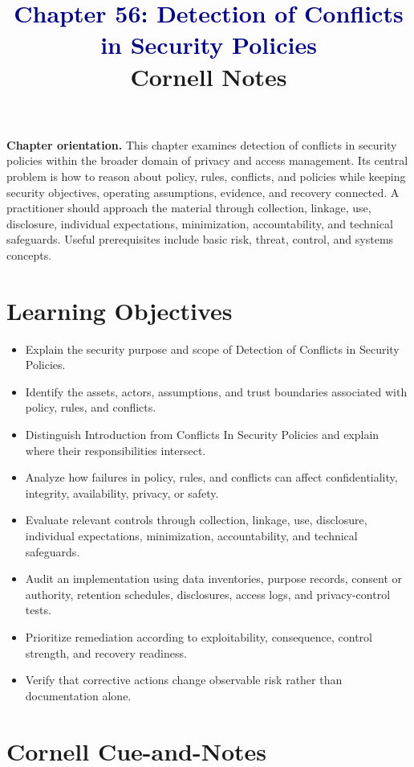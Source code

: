 \documentclass[11pt]{article}
\title{\textcolor{Navy}{Chapter 56: Detection of Conflicts in Security Policies}\\[2mm]\large Cornell Notes}
\author{}
\date{}
\begin{document}
\maketitle
\thispagestyle{fancy}
\vspace{-1.5em}
\begin{orientationbox}
\textbf{Chapter orientation.} This chapter examines detection of conflicts in security policies within the broader domain of privacy and access management. Its central problem is how to reason about policy, rules, conflicts, and policies while keeping security objectives, operating assumptions, evidence, and recovery connected. A practitioner should approach the material through collection, linkage, use, disclosure, individual expectations, minimization, accountability, and technical safeguards. Useful prerequisites include basic risk, threat, control, and systems concepts.
\end{orientationbox}
\section*{Learning Objectives}
\begin{itemize}
\item Explain the security purpose and scope of Detection of Conflicts in Security Policies.
\item Identify the assets, actors, assumptions, and trust boundaries associated with policy, rules, and conflicts.
\item Distinguish Introduction from Conflicts In Security Policies and explain where their responsibilities intersect.
\item Analyze how failures in policy, rules, and conflicts can affect confidentiality, integrity, availability, privacy, or safety.
\item Evaluate relevant controls through collection, linkage, use, disclosure, individual expectations, minimization, accountability, and technical safeguards.
\item Audit an implementation using data inventories, purpose records, consent or authority, retention schedules, disclosures, access logs, and privacy-control tests.
\item Prioritize remediation according to exploitability, consequence, control strength, and recovery readiness.
\item Verify that corrective actions change observable risk rather than documentation alone.
\end{itemize}
\section*{Cornell Cue-and-Notes}
\end{document}
